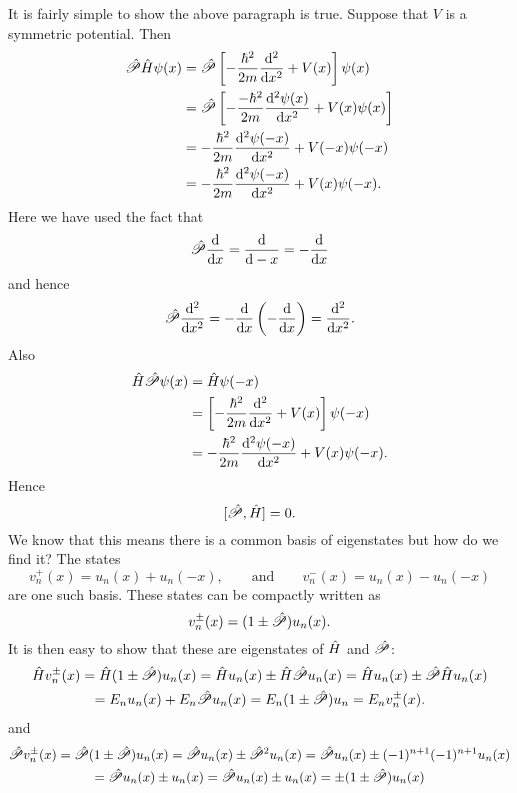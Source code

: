     It is fairly simple to show the above paragraph is true.
    Suppose that \(V\) is a symmetric potential.
    Then
    \begin{align*}
        \hat{\mathscr{P}}\hat{H}\psi(x) &= \hat{\mathscr{P}}\left[-\frac{\hbar^2}{2m}\dv[2]{x} + V(x)\right]\psi(x)\\
        &= \hat{\mathscr{P}}\left[-\frac{-\hbar^2}{2m}\dv[2]{\psi(x)}{x} + V(x)\psi(x)\right]\\
        &= -\frac{\hbar^2}{2m}\dv[2]{\psi(-x)}{x} + V(-x)\psi(-x)\\
        &= -\frac{\hbar^2}{2m}\dv[2]{\psi(-x)}{x} + V(x)\psi(-x).
     \end{align*}
    Here we have used the fact that
    \[\hat{\mathscr{P}}\dv{x} = \dv{-x} = -\dv{x}\]
    and hence
    \[\hat{\mathscr{P}}\dv[2]{x} = -\dv{x}\left(-\dv{x}\right) = \dv[2]{x}.\]
    Also
    \begin{align*}
        \hat{H}\hat{\mathscr{P}}\psi(x)& = \hat{H}\psi(-x)\\
        &= \left[-\frac{\hbar^2}{2m}\dv[2]{x} + V(x)\right]\psi(-x)\\
        &= -\frac{\hbar^2}{2m}\dv[2]{\psi(-x)}{x} + V(x)\psi(-x).
    \end{align*}
    Hence
    \[[\hat{\mathscr{P}}, \hat{H}] = 0.\]
    We know that this means there is a common basis of eigenstates but how do we find it?
    The states
    \[v_n^+(x) = u_n(x) + u_n(-x),\qquad\text{and}\qquad v_n^-(x) = u_n(x) - u_n(-x)\]
    are one such basis.
    These states can be compactly written as
    \[v_n^{\pm}(x) = (1 \pm \hat{\mathscr{P}})u_n(x).\]
    It is then easy to show that these are eigenstates of \(\hat{H}\) and \(\hat{\mathscr{P}}\):
    \begin{multline*}
        \hat{H}v_n^{\pm}(x) 
        = \hat{H}(1 \pm \hat{\mathscr{P}})u_n(x) 
        = \hat{H}u_n(x) \pm \hat{H}\hat{\mathscr{P}}u_n(x) 
        = \hat{H}u_n(x) \pm \hat{\mathscr{P}}\hat{H}u_n(x) \\
        = E_nu_n(x) + E_n\hat{\mathscr{P}}u_n(x) 
        = E_n(1 \pm \hat{\mathscr{P}})u_n 
        = E_nv_n^{\pm}(x).
    \end{multline*}
    and
    \begin{multline*}
        \hat{\mathscr{P}}v_n^{\pm}(x) 
        = \hat{\mathscr{P}}(1 \pm \hat{\mathscr{P}})u_n(x)
        = \hat{\mathscr{P}}u_n(x) \pm \hat{\mathscr{P}}^2u_n(x)
        = \hat{\mathscr{P}}u_n(x) \pm (-1)^{n+1}(-1)^{n+1}u_n(x)\\ 
        = \hat{\mathscr{P}}u_n(x) \pm u_n(x)
        = \hat{\mathscr{P}}u_n(x) \pm u_n(x)
        = \pm(1 \pm \hat{\mathscr{P}})u_n(x)
    \end{multline*}

